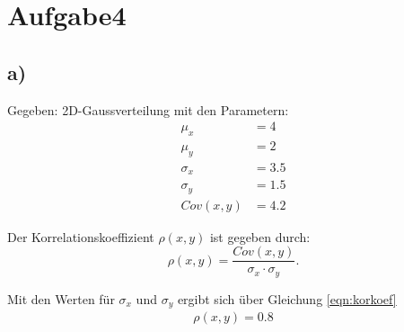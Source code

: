 \newpage
\section{Aufgabe4}
\label{sec:a4}

\subsection{a)}
\label{subsec:a4a}
Gegeben: 2D-Gaussverteilung mit den Parametern:
\\
\begin{align*}
\mu_{x} &= 4\\
\mu_{y} &= 2\\
\sigma_{x} &= 3.5\\
\sigma_{y} &= 1.5\\
Cov\left( x,y \right) &= 4.2
\end{align*}

Der Korrelationskoeffizient $\rho\left( x,y \right)$ ist gegeben durch:
\\
\begin{equation}
  \label{eqn:korkoef}
  \rho\left( x,y \right) = \frac{Cov\left( x,y \right)}{\sigma_{x} \cdot \sigma_{y}}.
\end{equation}

Mit den Werten für $\sigma_{x}$  und $\sigma_{y}$ ergibt sich über Gleichung \eqref{eqn:korkoef}
\\
\begin{align*}
    \rho\left( x,y \right) = 0.8
\end{align*}


